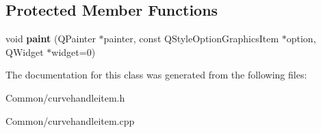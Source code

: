\subsection*{\-Protected \-Member \-Functions}
\begin{DoxyCompactItemize}
\item 
\hypertarget{class_curve_handle_item_a8c5663c9da38350e893b2853bffa9d8d}{
void {\bfseries paint} (\-Q\-Painter $\ast$painter, const \-Q\-Style\-Option\-Graphics\-Item $\ast$option, \-Q\-Widget $\ast$widget=0)}
\label{class_curve_handle_item_a8c5663c9da38350e893b2853bffa9d8d}

\end{DoxyCompactItemize}


\-The documentation for this class was generated from the following files\-:\begin{DoxyCompactItemize}
\item 
\-Common/curvehandleitem.\-h\item 
\-Common/curvehandleitem.\-cpp\end{DoxyCompactItemize}
